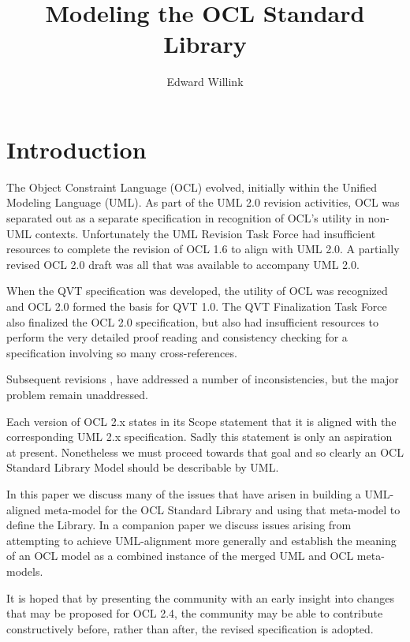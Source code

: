 \documentclass{eceasst}
\title{%
Modeling the OCL Standard Library}
\author{%
Edward Willink\autref{1}}
\institute{%
\autlabel{1} \email{ed \_at\_ willink.me.uk}, \url{http://www.eclipse.org/modeling}\\
Eclipse Modeling Project}
\begin{document}
\maketitle
\section{Introduction}

The Object Constraint Language (OCL) evolved, initially within the Unified Modeling Language (UML). As part of the UML 2.0\cite{UML-2.0} revision activities, OCL was separated out as a separate specification in recognition of OCL's utility in non-UML contexts. Unfortunately the UML Revision Task Force had insufficient resources to complete the revision of OCL 1.6\cite{OCL-1.6} to align with UML 2.0. A partially revised OCL 2.0 draft\cite{OCL-2.0-draft} was all that was available to accompany UML 2.0.

When the QVT specification was developed, the utility of OCL was recognized and OCL 2.0\cite{OCL-2.0} formed the basis for QVT 1.0\cite{QVT-1.0}. The QVT Finalization Task Force also finalized the OCL 2.0 specification, but also had insufficient resources to perform the very detailed proof reading and consistency checking for a specification involving so many cross-references.

Subsequent revisions \cite{OCL-2.2},\cite{OCL-2.3} have addressed a number of  inconsistencies, but the major problem remain unaddressed.





Each version of OCL 2.x states in its Scope statement that it is aligned with the corresponding UML 2.x specification. Sadly this statement is only an aspiration at present. Nonetheless we must proceed towards that goal and so clearly an OCL Standard Library Model should be describable by UML.

In this paper we discuss many of the issues that have arisen in building a UML-aligned meta-model for the OCL Standard Library and using that meta-model to define the Library. In a companion paper\cite{OCL-UML} we discuss issues arising from attempting to achieve UML-alignment more generally and establish the meaning of an OCL model as a combined instance of the merged UML and OCL meta-models.

It is hoped that by presenting the community with an early insight into changes that may be proposed for OCL 2.4, the community may be able to contribute constructively before, rather than after, the revised specification is adopted.
\end{document}
